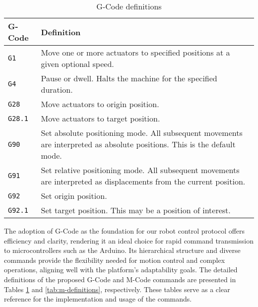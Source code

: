 \begingroup
\setlength{\tabcolsep}{10pt} %
\renewcommand{\arraystretch}{1.5} %
\begin{table}[H]
    \centering
    \caption{G-Code definitions}
    \label{tab:g-definitions}
    \begin{tabular}{p{}p{}}
    \toprule
    G-Code & Definition \\ \midrule
    \texttt{G1} & Move one or more actuators to specified positions at a given optional speed. \\
    \texttt{G4} & Pause or dwell. Halts the machine for the specified duration. \\
    \texttt{G28} & Move actuators to origin position. \\
    \texttt{G28.1} & Move actuators to target position. \\
    \texttt{G90} & Set absolute positioning mode. All subsequent movements are interpreted as absolute positions. This is the default mode. \\
    \texttt{G91} & Set relative positioning mode. All subsequent movements are interpreted as displacements from the current position. \\
    \texttt{G92} & Set origin position. \\
    \texttt{G92.1} & Set target position. This may be a position of interest. \\ \bottomrule
    \end{tabular}
\end{table}
\endgroup

The adoption of G-Code as the foundation for our robot control protocol offers efficiency and clarity, rendering it an ideal choice for rapid command transmission to microcontrollers such as the Arduino. Its hierarchical structure and diverse commands provide the flexibility needed for motion control and complex operations, aligning well with the platform's adaptability goals. The detailed definitions of the proposed G-Code and M-Code commands are presented in Tables \ref{tab:g-definitions} and \ref{tab:m-definitions}, respectively. These tables serve as a clear reference for the implementation and usage of the commands.

